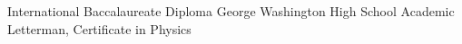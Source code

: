 {}
{International Baccalaureate Diploma} %
{George Washington High School} %
{Academic Letterman, Certificate in Physics} %
{}